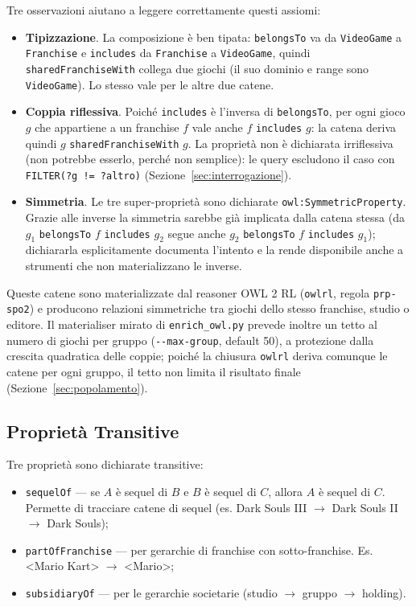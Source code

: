 Tre osservazioni aiutano a leggere correttamente questi assiomi:
\begingroup\sloppy
\begin{itemize}[nosep]
  \item \textbf{Tipizzazione}. La composizione \`e ben tipata: \texttt{belongsTo} va da
    \texttt{VideoGame} a \texttt{Franchise} e \texttt{includes} da \texttt{Franchise} a
    \texttt{VideoGame}, quindi \texttt{sharedFranchiseWith} collega due giochi (il suo
    dominio e range sono \texttt{VideoGame}). Lo stesso vale per le altre due catene.
  \item \textbf{Coppia riflessiva}. Poich\'e \texttt{includes} \`e l'inversa di
    \texttt{belongsTo}, per ogni gioco $g$ che appartiene a un franchise $f$ vale anche
    $f$ \texttt{includes} $g$: la catena deriva quindi $g$ \texttt{sharedFranchiseWith} $g$.
    La propriet\`a non \`e dichiarata irriflessiva (non potrebbe esserlo, perch\'e non semplice):
    le query escludono il caso con \texttt{FILTER(?g != ?altro)} (Sezione~\ref{sec:interrogazione}).
  \item \textbf{Simmetria}. Le tre super-propriet\`a sono dichiarate
    \texttt{owl:SymmetricProperty}. Grazie alle inverse la simmetria sarebbe gi\`a
    implicata dalla catena stessa (da $g_1$ \texttt{belongsTo} $f$ \texttt{includes} $g_2$
    segue anche $g_2$ \texttt{belongsTo} $f$ \texttt{includes} $g_1$); dichiararla
    esplicitamente documenta l'intento e la rende disponibile anche a strumenti che
    non materializzano le inverse.
\end{itemize}
\endgroup

Queste catene sono materializzate dal reasoner OWL 2 RL (\texttt{owlrl}, regola
\texttt{prp-spo2}) e producono relazioni simmetriche tra giochi dello stesso franchise,
studio o editore.
Il materialiser mirato di \texttt{enrich\_owl.py} prevede inoltre un tetto al numero di giochi per
gruppo (\texttt{-{}-max-group}, default 50), a protezione dalla crescita quadratica delle coppie; poich\'e
la chiusura \texttt{owlrl} deriva comunque le catene per ogni gruppo, il tetto non limita il risultato
finale (Sezione~\ref{sec:popolamento}).

\subsection{Propriet\`a Transitive}

Tre propriet\`a sono dichiarate transitive:

\begin{itemize}[nosep]
  \item \texttt{sequelOf} --- se $A$ \`e sequel di $B$ e $B$ \`e sequel di $C$,
    allora $A$ \`e sequel di $C$. Permette di tracciare catene di sequel
    (es. Dark Souls III $\rightarrow$ Dark Souls II $\rightarrow$ Dark Souls);
  \item \texttt{partOfFranchise} --- per gerarchie di franchise con sotto-franchise.
    Es. \textless{}Mario Kart\textgreater{} $\rightarrow$ \textless{}Mario\textgreater{};
  \item \texttt{subsidiaryOf} --- per le gerarchie societarie (studio $\rightarrow$
    gruppo $\rightarrow$ holding).
\end{itemize}

